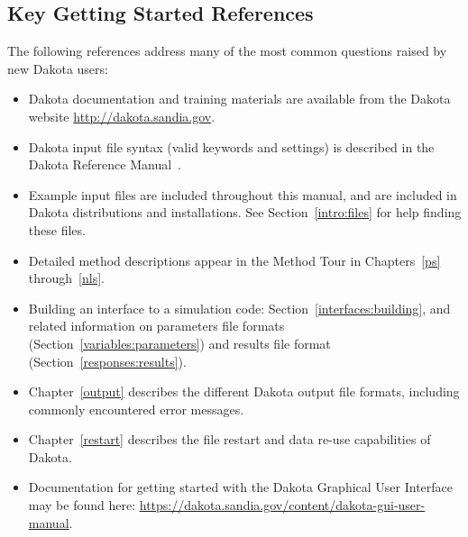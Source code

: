  
\subsection{Key Getting Started References}\label{tutorial:keyrefs}

The following references address many of the most common questions
raised by new Dakota users:
\begin{itemize}
\item Dakota documentation and training materials are available from
  the Dakota website \url{http://dakota.sandia.gov}.

\item Dakota input file syntax (valid keywords and settings) is
  described in the Dakota Reference Manual~\cite{RefMan}.

\item Example input files are included throughout this manual, and
  are included in Dakota distributions and installations. See
  Section~\ref{intro:files} for help finding these files.

\item Detailed method descriptions appear in the Method Tour in
  Chapters~\ref{ps} through~\ref{nls}.

\item Building an interface to a simulation code:
  Section~\ref{interfaces:building}, and related information on parameters
  file formats (Section~\ref{variables:parameters}) and results file
  format (Section~\ref{responses:results}).

\item Chapter~\ref{output} describes the different Dakota output file
  formats, including commonly encountered error messages.

\item Chapter~\ref{restart} describes the file restart and data re-use
  capabilities of Dakota.

\item Documentation for getting started with the Dakota Graphical
User Interface  may be found here:  
\url{https://dakota.sandia.gov/content/dakota-gui-user-manual}.

\end{itemize}
